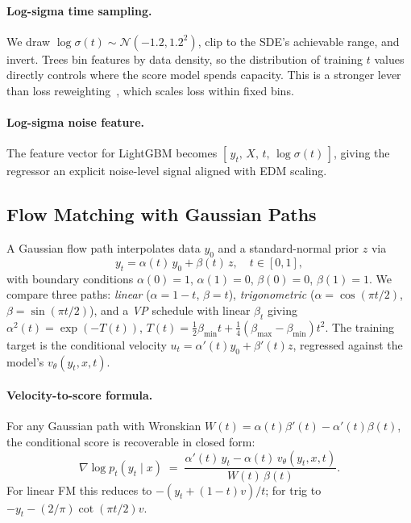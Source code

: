 \documentclass{tpm2026}
\newcommand{\Norm}{\mathcal{N}}
\begin{document}
\paragraph{Log-sigma time sampling.} We draw $\log\sigma(t) \sim \Norm(-1.2, 1.2^2)$, clip to the SDE's achievable range, and invert. Trees bin features by data density, so the distribution of training $t$ values directly controls where the score model spends capacity. This is a stronger lever than loss reweighting~\citep{hang2023minsnr}, which scales loss within fixed bins.

\paragraph{Log-sigma noise feature.} The feature vector for LightGBM becomes $[\,y_t,\,X,\,t,\,\log\sigma(t)\,]$, giving the regressor an explicit noise-level signal aligned with EDM scaling.

\subsection{Flow Matching with Gaussian Paths}\label{sec:fm}
A Gaussian flow path interpolates data $y_0$ and a standard-normal prior $z$ via
\begin{equation}\label{eq:path}
y_t = \alpha(t)\, y_0 + \beta(t)\, z, \quad t \in [0,1],
\end{equation}
with boundary conditions $\alpha(0)=1$, $\alpha(1)=0$, $\beta(0)=0$, $\beta(1)=1$. We compare three paths: \emph{linear} ($\alpha = 1-t$, $\beta = t$), \emph{trigonometric} ($\alpha = \cos(\pi t/2)$, $\beta = \sin(\pi t /2)$), and a \emph{VP} schedule with linear $\beta_t$ giving $\alpha^2(t) = \exp(-T(t))$, $T(t) = \tfrac{1}{2}\beta_{\min} t + \tfrac{1}{4}(\beta_{\max} - \beta_{\min}) t^2$. The training target is the conditional velocity $u_t = \alpha'(t) y_0 + \beta'(t) z$, regressed against the model's $v_\theta(y_t, x, t)$.

\paragraph{Velocity-to-score formula.} For any Gaussian path with Wronskian $W(t) = \alpha(t) \beta'(t) - \alpha'(t) \beta(t)$, the conditional score is recoverable in closed form:
\begin{equation}\label{eq:score}
\nabla \log p_t(y_t \mid x) \;=\; \frac{\alpha'(t)\, y_t - \alpha(t)\, v_\theta(y_t, x, t)}{W(t)\,\beta(t)}.
\end{equation}
For linear FM this reduces to $-(y_t + (1-t) v)/t$; for trig to $-y_t - (2/\pi)\cot(\pi t/2) v$.
\end{document}
